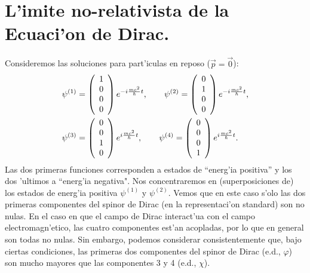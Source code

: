 \section{L'imite no-relativista de la Ecuaci'on de Dirac.}

Consideremos las soluciones para part'iculas en reposo ($\vec{p}=\vec{0}$):
\begin{align}
\psi^{(1)} & =\left(
\begin{array}
[c]{c}%
1\\
0\\
0\\
0
\end{array}
\right) e^{-i\frac{mc^2}{\hbar}t}, \qquad
\psi^{\left(
2\right)}=\left(
\begin{array}
[c]{c}%
0\\
1\\
0\\
0
\end{array}
\right) e^{-i\frac{mc^2}{\hbar}t} , \label{Solrep1}\\
\psi^{(3) } & =\left(
\begin{array}
[c]{c}%
0\\
0\\
1\\
0
\end{array}
\right) e^{i\frac{mc^2}{\hbar}t},\qquad
\psi^{\left(
4\right) }=\left(
\begin{array}
[c]{c}%
0\\
0\\
0\\
1
\end{array}
\right) e^{i\frac{mc^2}{\hbar}t}. \label{Solrep2}
\end{align}
Las dos primeras funciones corresponden a estados de ``energ'ia positiva'' y los
dos 'ultimos a ``energ'ia negativa". Nos concentraremos en (superposiciones de) los estados de energ'ia positiva $\psi^{(1)}$ y $\psi^{(2)}$. Vemos que en este caso s'olo las dos primeras componentes del
spinor de Dirac (en la representaci'on standard) son no nulas. En el caso en que el campo de Dirac interact'ua con el campo electromagn'etico, las cuatro componentes est'an acopladas, por lo que en general son todas no nulas. Sin embargo, podemos considerar consistentemente que, bajo ciertas condiciones, las primeras dos componentes del spinor de Dirac (e.d., $\varphi$) son mucho mayores que las componentes 3 y 4 (e.d., $\chi$).

